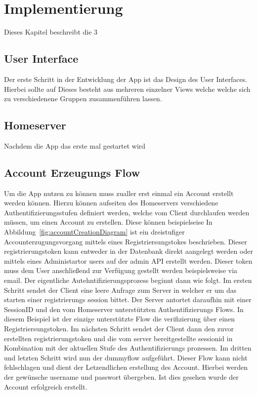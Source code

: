     \newpage
    \chapter{Implementierung}\label{ch:implementierung}
    Dieses Kapitel beschreibt die 3



    \section{User Interface}\label{sec:user-interface}
    Der erste Schritt in der Entwicklung der App ist das Design des User Interfaces.
    Hierbei sollte auf
    Dieses besteht aus mehreren einzelner Views welche welche sich zu verschiedenene Gruppen zusammenführen lassen.

    \section{Homeserver}\label{sec:homeserver}

    Nachdem die App das erste mal gestartet wird
    \newpage
    \section{Account Erzeugungs Flow}\label{sec:account-erzeugungs-flow}
    Um die App nutzen zu können muss zualler erst einmal ein Account erstellt werden können.
    Hierzu können aufseiten des Homeservers verschiedene Authentifizierungsstufen definiert werden, welche vom Client durchlaufen werden müssen, um einen Account zu erstellen.
    Diese können beispielseise
    In Abbildung~\ref{fig:accountCreationDiagram} ist ein dreistufiger Accounterzugungsvorgang mittels eines Registriersungstokes beschrieben.
    Dieser registrierungstoken kann entweder in der Datenbank direkt aangelegt werden oder mittels eines Administartor users auf der admin API erstellt werden.
    Dieser token muss dem User anschließend zur Verfügung gestellt werden beispielsweise via email.
    Der eigentliche Autehntifizierungsprozess beginnt dann wie folgt.
    Im ersten Schritt sendet der Client eine leere Anfrage zum Server in welcher er um das starten einer registrierungs session bittet.
    Der Server antortet daraufhin mit einer SessionID und den vom Homeserver unterstützten Authentifizierungs Flows.
    In diesem Beispiel ist der einzige unterstützte Flow die verifizierung über einen Registriersungstoken.
    Im nächsten Schritt sendet der Client dann den zuvor erstellten registrierungstoken und die vom server bereitgestellte sessionid in Kombination mit der aktuellen Stufe des Authentifizierungs prozessen.
    Im dritten und letzten Schritt wird nun der dummyflow aufgeführt.
    Dieser Flow kann nicht fehlschlagen und dient der Letzendlichen erstellung des Account.
    Hierbei werden der gewünsche username und passwort übergeben.
    Ist dies gesehen wurde der Account erfolgreich erstellt.

